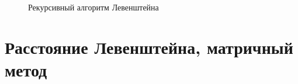\documentclass[12pt,a4paper]{report}
\begin{document}
\begin{figure}[ht]
    \caption{Рекурсивный алгоритм Левенштейна}
\end{figure}

\newpage
\section{Расстояние Левенштейна, матричный метод} \
\end{document}
